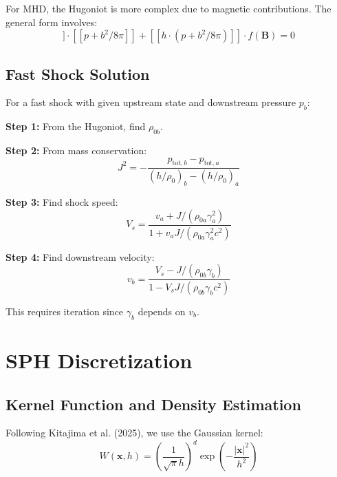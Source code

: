 \documentclass[12pt,a4paper]{article}
\begin{document}
For MHD, the Hugoniot is more complex due to magnetic contributions. The general
form involves:
\begin{equation}
[\![ h ]\!] \cdot [\![ p + b^2/8\pi ]\!] + [\![ h \cdot (p + b^2/8\pi) ]\!] \cdot f(\bm{B}) = 0
\label{eq:hugoniot_mhd}
\end{equation}

\subsection{Fast Shock Solution}

For a fast shock with given upstream state and downstream pressure $p_b$:

\textbf{Step 1:} From the Hugoniot, find $\rho_{0b}$.

\textbf{Step 2:} From mass conservation:
\begin{equation}
J^2 = -\frac{p_{\text{tot},b} - p_{\text{tot},a}}{(h/\rho_0)_b - (h/\rho_0)_a}
\label{eq:J_squared}
\end{equation}

\textbf{Step 3:} Find shock speed:
\begin{equation}
V_s = \frac{v_a + J/(\rho_{0a} \gamma_a^2)}{1 + v_a J/(\rho_{0a} \gamma_a^2 c^2)}
\label{eq:shock_speed_formula}
\end{equation}

\textbf{Step 4:} Find downstream velocity:
\begin{equation}
v_b = \frac{V_s - J/(\rho_{0b}\gamma_b)}{1 - V_s J/(\rho_{0b}\gamma_b c^2)}
\label{eq:downstream_velocity}
\end{equation}

This requires iteration since $\gamma_b$ depends on $v_b$.

\section{SPH Discretization}

\subsection{Kernel Function and Density Estimation}

Following Kitajima et al. (2025), we use the Gaussian kernel:
\begin{equation}
W(\bm{x}, h) = \left(\frac{1}{\sqrt{\pi} h}\right)^d \exp\left(-\frac{|\bm{x}|^2}{h^2}\right)
\label{eq:kernel}
\end{equation}
\end{document}
